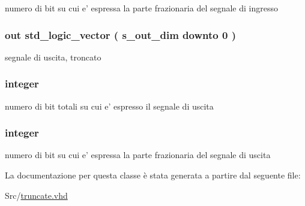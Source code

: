 numero di bit su cui e' espressa la parte frazionaria del segnale di ingresso 

\hypertarget{classtruncate_a7c0b5e84820296cfa624ce710d19debd}{
\subsubsection[{s\+\_\+out}]{ {\bfseries \textcolor{vhdlchar}{out}\textcolor{vhdlchar}{ }} {\bfseries \textcolor{vhdlchar}{std\+\_\+logic\+\_\+vector}\textcolor{vhdlchar}{ }\textcolor{vhdlchar}{(}\textcolor{vhdlchar}{ }\textcolor{vhdlchar}{ }\textcolor{vhdlchar}{ }\textcolor{vhdlchar}{ }{\bfseries {\bf s\+\_\+out\+\_\+dim}} \textcolor{vhdlchar}{ }\textcolor{vhdlchar}{downto}\textcolor{vhdlchar}{ }\textcolor{vhdlchar}{ } \textcolor{vhdldigit}{0} \textcolor{vhdlchar}{ }\textcolor{vhdlchar}{)}\textcolor{vhdlchar}{ }} \hspace{0.3cm}{\ttfamily [Port]}}}\label{classtruncate_a7c0b5e84820296cfa624ce710d19debd}


segnale di uscita, troncato 

\hypertarget{classtruncate_a8b62f8bfecb0fab845995b8b051101bc}{
\subsubsection[{s\+\_\+out\+\_\+dim}]{ {\bfseries \textcolor{vhdlchar}{ }} {\bfseries \textcolor{vhdlchar}{integer}\textcolor{vhdlchar}{ }} \hspace{0.3cm}{\ttfamily [Generic]}}}\label{classtruncate_a8b62f8bfecb0fab845995b8b051101bc}


numero di bit totali su cui e' espresso il segnale di uscita 

\hypertarget{classtruncate_a4ca792ca981e2f9d82bf36d9c82c08af}{
\subsubsection[{s\+\_\+out\+\_\+int}]{ {\bfseries \textcolor{vhdlchar}{ }} {\bfseries \textcolor{vhdlchar}{integer}\textcolor{vhdlchar}{ }} \hspace{0.3cm}{\ttfamily [Generic]}}}\label{classtruncate_a4ca792ca981e2f9d82bf36d9c82c08af}


numero di bit su cui e' espressa la parte frazionaria del segnale di uscita 



La documentazione per questa classe è stata generata a partire dal seguente file\+:\begin{DoxyCompactItemize}
\item 
Src/\hyperlink{truncate_8vhd}{truncate.\+vhd}\end{DoxyCompactItemize}
